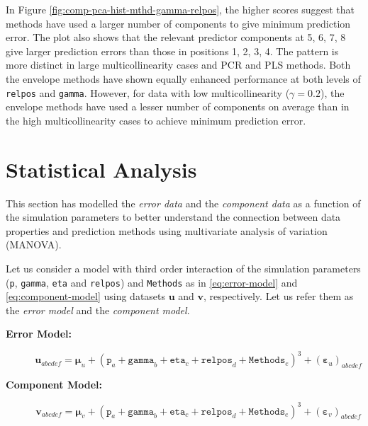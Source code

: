 \documentclass[review]{elsarticle}
\begin{document}
In Figure \ref{fig:comp-pca-hist-mthd-gamma-relpos}, the higher scores
suggest that methods have used a larger number of components to give
minimum prediction error. The plot also shows that the relevant
predictor components at 5, 6, 7, 8 give larger prediction errors than
those in positions 1, 2, 3, 4. The pattern is more distinct in large
multicollinearity cases and PCR and PLS methods. Both the envelope
methods have shown equally enhanced performance at both levels of
\texttt{relpos} and \texttt{gamma}. However, for data with low
multicollinearity (\(\gamma = 0.2\)), the envelope methods have used a
lesser number of components on average than in the high
multicollinearity cases to achieve minimum prediction error.

\section{Statistical Analysis}\label{statistical-analysis}

This section has modelled the \emph{error data} and the \emph{component
data} as a function of the simulation parameters to better understand
the connection between data properties and prediction methods using
multivariate analysis of variation (MANOVA).

Let us consider a model with third order interaction of the simulation
parameters (\texttt{p}, \texttt{gamma}, \texttt{eta} and
\texttt{relpos}) and \texttt{Methods} as in \eqref{eq:error-model} and
\eqref{eq:component-model} using datasets \(\mathbf{u}\) and
\(\mathbf{v}\), respectively. Let us refer them as the \emph{error
model} and the \emph{component model}.

\begin{description}
\item[\textbf{Error Model:}]
\begin{equation}\mathbf{u}_{abcdef} = \boldsymbol{\mu}_u +
  (\texttt{p}_a + \texttt{gamma}_b + \texttt{eta}_c +
\texttt{relpos}_d + \texttt{Methods}_e)^3 +
  \left(\boldsymbol{\varepsilon}_u\right)_{abcdef}
  \label{eq:error-model}
  \end{equation}
\item[\textbf{Component Model:}]
\begin{equation}\mathbf{v}_{abcdef} = \boldsymbol{\mu}_v +
  (\texttt{p}_a + \texttt{gamma}_b + \texttt{eta}_c +
\texttt{relpos}_d + \texttt{Methods}_e)^3 +
  \left(\boldsymbol{\varepsilon}_v\right)_{abcdef}
  \label{eq:component-model}
  \end{equation}
\end{description}
\end{document}
